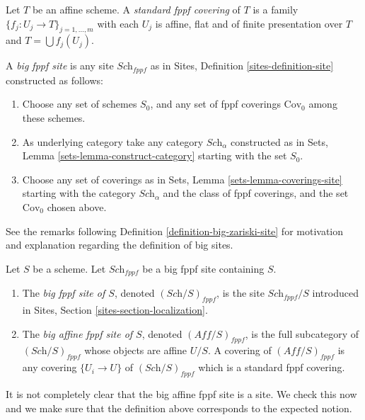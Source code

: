 \begin{definition}
\label{definition-standard-fppf}
Let $T$ be an affine scheme. A {\it standard fppf covering}
of $T$ is a family $\{f_j : U_j \to T\}_{j = 1, \ldots, m}$
with each $U_j$ is affine, flat and of finite presentation over $T$
and $T = \bigcup f_j(U_j)$.
\end{definition}

\begin{definition}
\label{definition-big-fppf-site}
A {\it big fppf site} is any site $\textit{Sch}_{fppf}$ as in
Sites, Definition \ref{sites-definition-site} constructed as follows:
\begin{enumerate}
\item Choose any set of schemes $S_0$, and any set of fppf coverings
$\text{Cov}_0$ among these schemes.
\item As underlying category take any category $\textit{Sch}_\alpha$
constructed as in Sets, Lemma \ref{sets-lemma-construct-category}
starting with the set $S_0$.
\item Choose any set of coverings as in
Sets, Lemma \ref{sets-lemma-coverings-site} starting with the
category $\textit{Sch}_\alpha$ and the class of fppf coverings,
and the set $\text{Cov}_0$ chosen above.
\end{enumerate}
\end{definition}

\noindent
See the remarks following Definition \ref{definition-big-zariski-site}
for motivation and explanation regarding the definition of big sites.

\begin{definition}
\label{definition-big-small-fppf}
Let $S$ be a scheme. Let $\textit{Sch}_{fppf}$ be a big fppf
site containing $S$.
\begin{enumerate}
\item The {\it big fppf site of $S$}, denoted
$(\textit{Sch}/S)_{fppf}$, is the site $\textit{Sch}_{fppf}/S$
introduced in Sites, Section \ref{sites-section-localization}.
\item The {\it big affine fppf site of $S$}, denoted
$(\textit{Aff}/S)_{fppf}$, is the full subcategory of
$(\textit{Sch}/S)_{fppf}$ whose objects are affine $U/S$.
A covering of $(\textit{Aff}/S)_{fppf}$ is any covering
$\{U_i \to U\}$ of $(\textit{Sch}/S)_{fppf}$ which is a
standard fppf covering.
\end{enumerate}
\end{definition}

\noindent
It is not completely clear that
the big affine fppf site is a site. We check this now
and we make sure that the definition above corresponds to
the expected notion.

